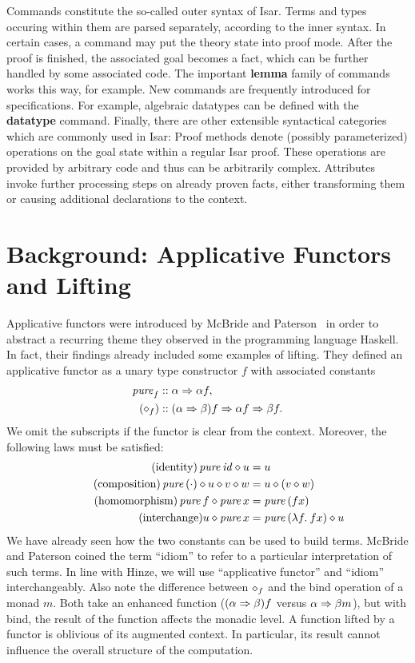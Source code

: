 Commands constitute the so-called outer syntax of Isar.
Terms and types occuring within them are parsed separately, according to the
inner syntax.
In certain cases, a command may put the theory state into proof mode.
After the proof is finished, the associated goal becomes a fact, which can be
further handled by some associated code.
The important \textbf{lemma} family of commands works this way, for example.
New commands are frequently introduced for specifications.
For example, algebraic datatypes can be defined with the \textbf{datatype} command.
Finally, there are other extensible syntactical categories which are commonly
used in Isar:
Proof methods denote (possibly parameterized) operations on the goal state
within a regular Isar proof.
These operations are provided by arbitrary code and thus can be arbitrarily
complex.
Attributes invoke further processing steps on already proven facts, either
transforming them or causing additional declarations to the context.


\section{Background: Applicative Functors and Lifting}\label{subsec:applicative}

Applicative functors were introduced by McBride and Paterson~\cite{mcbride08}
in order to abstract a recurring theme they observed in the programming language
Haskell.
In fact, their findings already included some examples of lifting.
They defined an applicative functor as a unary type constructor $f$ with
associated constants
\begin{align*}
	\operatorname{\mathit{pure}}_f &\mathrel{::} \alpha \Rightarrow \alpha f, \\
	(\diamond_f) &\mathrel{::} (\alpha \Rightarrow \beta) f \Rightarrow \alpha f \Rightarrow \beta f.
\end{align*}
We omit the subscripts if the functor is clear from the context.
Moreover, the following laws must be satisfied:
\begin{align*}
	\tag{identity} \operatorname{\mathit{pure}}{\mathit{id}} \diamond u &= u \\
	\tag{composition} \operatorname{\mathit{pure}}{(\cdot)} \diamond u \diamond v \diamond w &= u \diamond (v \diamond w) \\
	\tag{homomorphism} \operatorname{\mathit{pure}}{f} \diamond \operatorname{\mathit{pure}} x &= \operatorname{\mathit{pure}}{(f x)} \\
	\tag{interchange} u \diamond \operatorname{\mathit{pure}}{x} &= \operatorname{\mathit{pure}}{(\lambda f.\>f x)} \diamond u
\end{align*}
We have already seen how the two constants can be used to build terms.
McBride and Paterson coined the term ``idiom'' to refer to a particular
interpretation of such terms.
In line with Hinze, we will use ``applicative functor'' and ``idiom''
interchangeably.
Also note the difference between $\diamond_f$ and the bind operation of a monad $m$.
Both take an enhanced function ($(\alpha \Rightarrow \beta) f$ versus
$\alpha \Rightarrow \beta m$), but with bind, the result of the function affects
the monadic level.
A function lifted by a functor is oblivious of its augmented context.
In particular, its result cannot influence the overall structure of the
computation.

